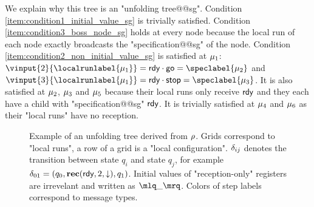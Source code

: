 \begin{example}
	We explain why this tree is an "unfolding tree@@sg". Condition \ref{item:condition1_initial_value_sg} is trivially satisfied. 
	Condition \ref{item:condition3_boss_node_sg} holds at every node because the local run of each node exactly broadcasts the "specification@@sg" of the node. Condition  \ref{item:condition2_non_initial_value_sg} is satisfied at $\mu_1$: $\vinput{2}{\localrunlabel{\node_1}}= \exready \cdot \exgotwo = \speclabel{\node_2}$ and $\vinput{3}{\localrunlabel{\node_1}}= \exready \cdot \exgothree = \speclabel{\node_3}$.
	It is also satisfied at $\mu_2$, $\mu_3$ and $\mu_5$ because their local runs only receive $\textsf{rdy}$ and they each have a child with "specification@@sg" $\textsf{rdy}$. 
	It is trivially satisfied at $\mu_4$ and $\mu_6$ as their "local runs" have no reception.  
\end{example}


\begin{figure}[t]
	\centering
	
	\vspace{-0.5cm}
	\caption{Example of an unfolding tree derived from $\rho$. Grids correspond to "local runs", a row of a grid is a "local configuration". $\delta_{ij}$ denotes the transition between state $q_i$ and state $q_j$, for example $\delta_{01} = (q_0, \textbf{rec}(\textsf{rdy}, 2, \downarrow), q_1)$. Initial values of "reception-only" registers are irrevelant and written as $\quotemarks{\_}$. Colors of step labels correspond to message types.}
	\label{fig:ex-unfolding-tree-signature}
\end{figure}


